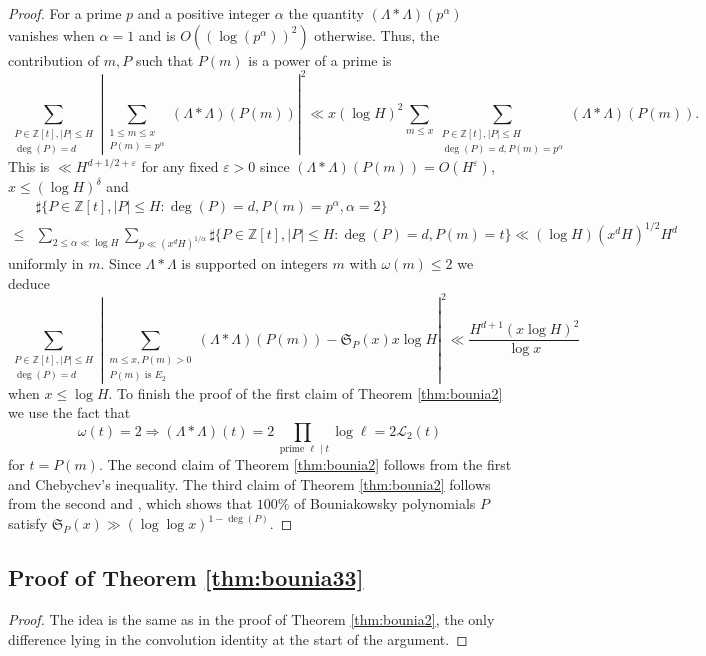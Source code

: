 \documentclass[reqno, 11pt]{amsart}
\numberwithin{equation}{section}
\theoremstyle{definition}
\newcommand{\0}{\mathbf{0}}
\renewcommand{\leq}{\leqslant}
\renewcommand{\P}{\mathbb{P}}
\renewcommand{\c}{\mathcal}
\renewcommand{\epsilon}{\varepsilon}
\renewcommand{\leq}{\leqslant}
\renewcommand{\#}{\sharp}
\begin{document}
\begin{proof}
For a prime $p$ and a positive integer $\alpha$ the quantity $(\Lambda\ast \Lambda)(p^\alpha)$ vanishes when $\alpha=1$ and is 
$O((\log (p^\alpha))^2)$ otherwise. Thus, the contribution of $m,P$ such that $P(m)$ is a  power of a prime is  $$
\sum_{\substack{ P\in \mathbb Z[t],|P|\leq H \\  \deg(P)=d}}  \left| \sum_{\substack{1\leq m\leq x\\P(m)=p^\alpha } } 
(\Lambda \ast \Lambda)(P(m)) \right|^2  \ll x (\log H)^2 \sum_{m\leq x} 
\sum_{\substack{ P\in \mathbb Z[t],|P|\leq H \\  \deg(P)=d,P(m)=p^\alpha } } (\Lambda \ast \Lambda)(P(m)).$$
This is $ \ll H^{d+1/2+\epsilon} $ for any fixed $\epsilon>0$ since $(\Lambda \ast \Lambda)(P(m))=O(H^\epsilon)$,
$x\leq (\log H)^\delta$ and  \begin{align*} &\#\{ P\in \mathbb Z[t],|P|\leq H:\deg(P)=d,P(m)=p^\alpha, \alpha =2\} \\ 
\leq  &\sum_{2\leq \alpha \ll \log H}  \sum_{p \ll (x^d H)^{1/\alpha}} \#\{ P\in \mathbb Z[t],|P|\leq H:
\deg(P)=d,P(m)=t\}\ll (\log H) (x^d H)^{1/2} H^d \end{align*} uniformly in $m$. Since $\Lambda\ast \Lambda$ is supported 
on integers $m$ with $\omega(m)\leq 2 $   we deduce  $$ \sum_{\substack{ P\in \mathbb Z[t],|P|\leq H \\  \deg(P)=d}} 
\left| \sum_{\substack{  m\leq x, P(m)>0\\ P(m) \textrm{ is } E_2 } }  (\Lambda \ast \Lambda)(P(m)) - \mathfrak S_{P}(x) x  
\log H  \right|^2  \ll  \frac{H^{d+1} (x \log H)^2}  {\log x}$$  when  $x\leq \log H$. To finish the proof of the first claim of 
Theorem \ref{thm:bounia2} we use the fact that  \[  \omega(t)=2 \Rightarrow  (\Lambda\ast  \Lambda)(t)=2 \prod_{ \textrm{ prime } 
\ell  \mid t} \log \ell =2 \c L_2(t) \]for $t=P(m)$. The second claim of Theorem \ref{thm:bounia2} follows from the first and Chebychev's inequality.  The third  claim of Theorem \ref{thm:bounia2} follows from the second and \cite[Lemma 4.11]{MR485740}, which shows that $100\%$ of Bouniakowsky polynomials  $P$ satisfy $\mathfrak S_P(x)\gg  (\log \log x)^{1-\deg(P)}$.
 \end{proof}\subsection{Proof   of Theorem \ref{thm:bounia33}} \begin{proof}The idea is   the same as in  the proof of  Theorem  \ref{thm:bounia2}, the only difference lying in  the convolution identity at the start of the argument.

\end{proof}
\end{document}
